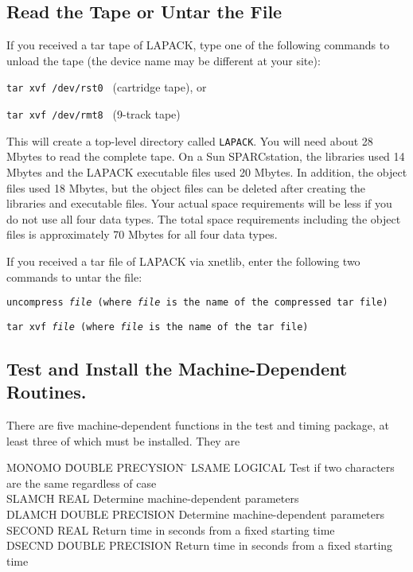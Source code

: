 \subsection{Read the Tape or Untar the File}
\dent
If you received a tar tape of LAPACK, type one of the following commands
to unload the tape
(the device name may be different at your site):

\begin{list}{}{}
\item{{\tt tar  xvf  /dev/rst0 }}    (cartridge tape),  or

\item{{\tt tar  xvf  /dev/rmt8 }}    (9-track tape)
\end{list}

\noindent
This will create a top-level directory called {\tt LAPACK}.
You will need about 28 Mbytes to read the complete tape.
On a Sun SPARCstation, the libraries used 14 Mbytes and the
LAPACK executable files used 20 Mbytes. 
In addition, the object files used
18 Mbytes, but the object files can be deleted after creating
the libraries and executable files.
Your actual space requirements will be less if you do not
use all four data types.  The total space requirements
including the object files is approximately 70 Mbytes for all four
data types.

If you received a tar file of LAPACK via xnetlib,
enter the following two commands to untar the file:

\begin{list}{}
\item{{\tt uncompress {\em file} (where {\em file} is the name of the
compressed tar file)}}
\item{{\tt tar xvf {\em file} (where {\em file} is the name of the tar
file)}}
\end{list}

\subsection{Test and Install the Machine-Dependent Routines.}
\dent
There are five machine-dependent functions in the test and timing
package, at least three of which must be installed.  They are

\begin{tabbing}
MONOMO  \=  DOUBLE PRECYSION  \=  \kill
LSAME   \>  LOGICAL      \> Test if two characters are the same regardless of case \\
SLAMCH  \>  REAL  \> Determine machine-dependent parameters \\
DLAMCH  \>  DOUBLE PRECISION \> Determine machine-dependent parameters \\
SECOND  \>  REAL  \> Return time in seconds from a fixed starting time \\
DSECND  \>  DOUBLE PRECISION  \> Return time in seconds from a fixed starting time
\end{tabbing}

